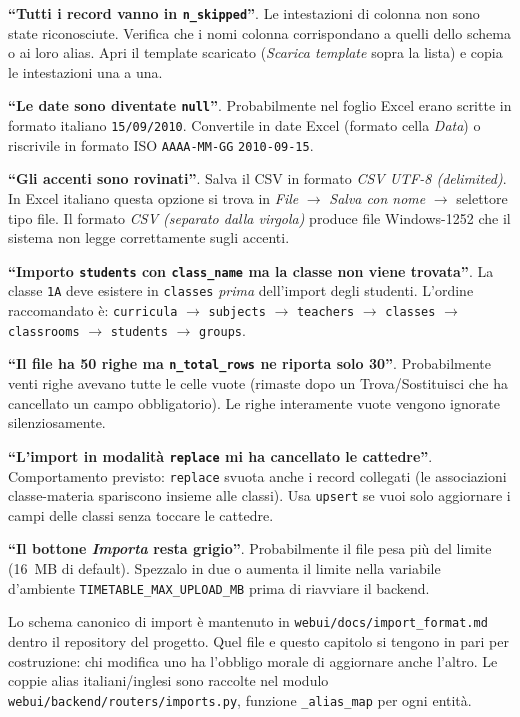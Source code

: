 \begin{erroricomunibox}
\textbf{``Tutti i record vanno in \texttt{n\_skipped}''}. Le
intestazioni di colonna non sono state riconosciute. Verifica che
i nomi colonna corrispondano a quelli dello schema o ai loro
alias. Apri il template scaricato (\emph{Scarica template} sopra
la lista) e copia le intestazioni una a una.

\textbf{``Le date sono diventate \texttt{null}''}. Probabilmente
nel foglio Excel erano scritte in formato italiano
\texttt{15/09/2010}. Convertile in date Excel (formato cella
\emph{Data}) o riscrivile in formato ISO
\texttt{AAAA-MM-GG} \texttt{2010-09-15}.

\textbf{``Gli accenti sono rovinati''}. Salva il CSV in formato
\emph{CSV UTF-8 (delimited)}. In Excel italiano questa opzione
si trova in \emph{File} $\to$ \emph{Salva con nome} $\to$
selettore tipo file. Il formato \emph{CSV (separato dalla
virgola)} produce file Windows-1252 che il sistema non legge
correttamente sugli accenti.

\textbf{``Importo \texttt{students} con \texttt{class\_name}
ma la classe non viene trovata''}. La classe \texttt{1A} deve
esistere in \texttt{classes} \emph{prima} dell'import degli
studenti. L'ordine raccomandato \`e:
\texttt{curricula} $\to$ \texttt{subjects} $\to$ \texttt{teachers}
$\to$ \texttt{classes} $\to$ \texttt{classrooms} $\to$
\texttt{students} $\to$ \texttt{groups}.

\textbf{``Il file ha 50 righe ma \texttt{n\_total\_rows} ne riporta
solo 30''}. Probabilmente venti righe avevano tutte le celle
vuote (rimaste dopo un Trova/Sostituisci che ha cancellato un
campo obbligatorio). Le righe interamente vuote vengono ignorate
silenziosamente.

\textbf{``L'import in modalit\`a \texttt{replace} mi ha cancellato
le cattedre''}. Comportamento previsto: \texttt{replace} svuota
anche i record collegati (le associazioni classe-materia spariscono
insieme alle classi). Usa \texttt{upsert} se vuoi solo aggiornare
i campi delle classi senza toccare le cattedre.

\textbf{``Il bottone \emph{Importa} resta grigio''}. Probabilmente
il file pesa pi\`u del limite (\SI{16}{MB} di default). Spezzalo in
due o aumenta il limite nella variabile d'ambiente
\texttt{TIMETABLE\_MAX\_UPLOAD\_MB} prima di riavviare il
backend.
\end{erroricomunibox}

\fleuron

\begin{biblioparvabox}
Lo schema canonico di import \`e mantenuto in
\texttt{webui/docs/import\_format.md} dentro il repository del
progetto. Quel file e questo capitolo si tengono in pari per
costruzione: chi modifica uno ha l'obbligo morale di aggiornare
anche l'altro. Le coppie alias italiani/inglesi sono raccolte
nel modulo \texttt{webui/backend/routers/imports.py},
funzione \texttt{\_alias\_map} per ogni entit\`a.
\end{biblioparvabox}
